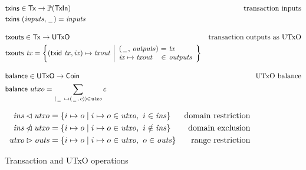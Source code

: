 \documentclass[11pt,a4paper]{article}
\begin{document}
\begin{figure}

\begin{align*}
& \mathsf{txins} \in \mathsf{Tx} \to \powerset{\mathsf{TxIn}}
& \text{transaction inputs} \\
& \mathsf{txins} ~ (\mathit{inputs}, \,\underline{\phantom{a}}\,) = \mathit{inputs}
\\[1em]
& \mathsf{txouts} \in \mathsf{Tx} \to \mathsf{UTxO}
& \text{transaction outputs as UTxO} \\
& \mathsf{txouts} ~ \mathit{tx} =
  \left\{ (\mathsf{txid} ~ \mathit{tx}, \mathit{ix}) \mapsto \mathit{txout} ~
  \middle| \begin{array}{l@{~}c@{~}l}
             (\,\underline{\phantom{a}}\,,\, \mathit{outputs}) & = & \mathit{tx} \\
             \mathit{ix} \mapsto \mathit{txout} & \in & \mathit{outputs}
           \end{array}
  \right\}
\\[1em]
& \mathsf{balance} \in \mathsf{UTxO} \to \mathsf{Coin}
& \text{UTxO balance} \\
& \mathsf{balance} ~ utxo = \sum_{(\,\underline{\phantom{a}}\, ~ \mapsto (\,\underline{\phantom{a}}\,, \,c)) \in \mathit{utxo}} c
\end{align*}

\begin{align*}
  \mathit{ins} \lhd \mathit{utxo}
& = \{ i \mapsto o \mid i \mapsto o \in \mathit{utxo}, ~ i \in \mathit{ins} \}
& \text{domain restriction}
\\
  \mathit{ins} \mathbin{\slashed{\lhd}} \mathit{utxo}
& = \{ i \mapsto o \mid i \mapsto o \in \mathit{utxo}, ~ i \notin \mathit{ins} \}
& \text{domain exclusion}
\\
  \mathit{utxo} \rhd \mathit{outs}
& = \{ i \mapsto o \mid i \mapsto o \in \mathit{utxo}, ~ o \in \mathit{outs} \}
& \text{range restriction}
\end{align*}

\caption{\label{fig:auxiliary_ops}Transaction and UTxO operations}
\end{figure}
\end{document}
